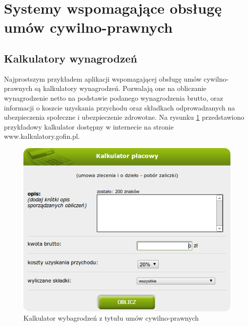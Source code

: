 \section[Systemy wspomagające obsługę umów cywilno-prawnych][Systemy wspomagające obsługę umów cywilno-prawnych]{Systemy wspomagające obsługę umów cywilno-prawnych}

\subsection[Kalkulatory wynagrodzeń][Kalkulatory wynagrodzeń]{Kalkulatory wynagrodzeń}
Najprostszym przykładem aplikacji wspomagającej obsługę umów cywilno-prawnych są kalkulatory wynagrodzeń. Pozwalają one na obliczanie wynagrodzenie netto na podstawie podanego wynagrodzenia brutto, oraz informacji o koszcie uzyskania przychodu oraz składkach odprowadzanych na ubezpieczenia społeczne i ubezpieczenie zdrowotne. Na rysunku \ref{kalkulator} przedstawiono przykładowy kalkulator dostępny w internecie na stronie www.kalkulatory.gofin.pl.

\begin{figure}[tdh]
    \begin{center}
	\includegraphics[scale=.6]{img/kalkulator.png}
	\caption{Kalkulator wybagrodzeń z tytułu umów cywilno-prawnych}
	\label{kalkulator}
    \end{center}
\end{figure}

